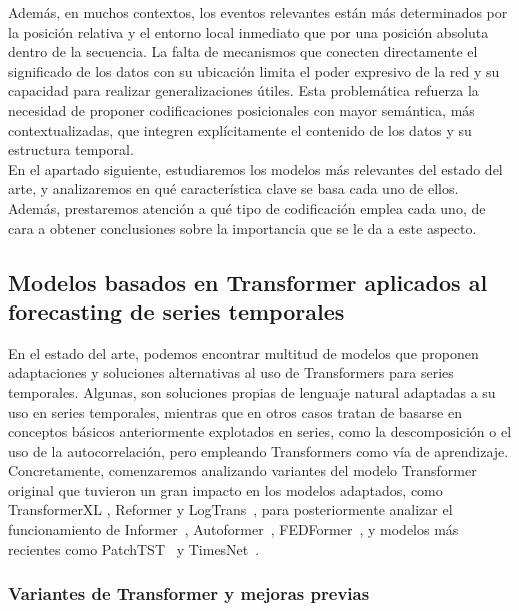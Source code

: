 Además, en muchos contextos, los eventos relevantes están más determinados por la posición relativa y el entorno local inmediato que por una posición absoluta dentro de la secuencia. La falta de mecanismos que conecten directamente el significado de los datos con su ubicación limita el poder expresivo de la red y su capacidad para realizar generalizaciones útiles. Esta problemática refuerza la necesidad de proponer codificaciones posicionales con mayor semántica, más contextualizadas, que integren explícitamente el contenido de los datos y su estructura temporal.\\

En el apartado siguiente, estudiaremos los modelos más relevantes del estado del arte, y analizaremos en qué característica clave se basa cada uno de ellos. Además, prestaremos atención a qué tipo de codificación emplea cada uno, de cara a obtener conclusiones sobre la importancia que se le da a este aspecto.

\subsection{Modelos basados en Transformer aplicados al forecasting de series temporales}

En el estado del arte, podemos encontrar multitud de modelos que proponen adaptaciones y soluciones alternativas al uso de Transformers para series temporales. Algunas, son soluciones propias de lenguaje natural adaptadas a su uso en series temporales, mientras que en otros casos tratan de basarse en conceptos básicos anteriormente explotados en series, como la descomposición o el uso de la autocorrelación, pero empleando Transformers como vía de aprendizaje.\\

Concretamente, comenzaremos analizando variantes del modelo Transformer original que tuvieron un gran impacto en los modelos adaptados, como TransformerXL \cite{dai2019transformerxlattentivelanguagemodels}, Reformer \cite{kitaev2020reformerefficienttransformer} y LogTrans~\cite{NEURIPS2019_6775a063}, para posteriormente analizar el funcionamiento de Informer~\cite{zhou2021informerefficienttransformerlong}, Autoformer~\cite{wu2022autoformerdecompositiontransformersautocorrelation}, FEDFormer~\cite{zhou2022fedformerfrequencyenhanceddecomposed}, y modelos más recientes como PatchTST~\cite{nie2023timeseriesworth64} y TimesNet~\cite{wu2023timesnettemporal2dvariationmodeling}.

\subsubsection{Variantes de Transformer y mejoras previas}

